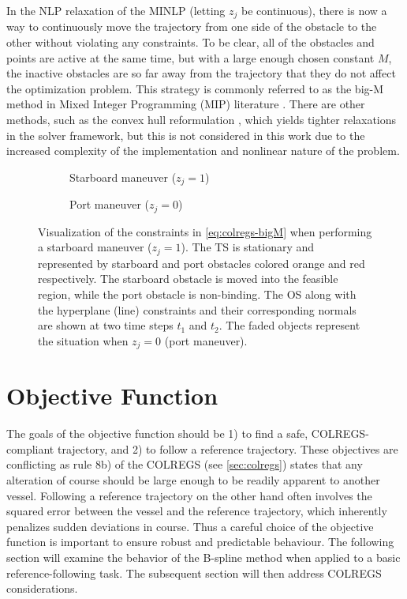 In the NLP relaxation of the MINLP (letting $z_j$ be continuous), there is now a way to continuously move the trajectory from one side of the obstacle to the other without violating any constraints. To be clear, all of the obstacles and points are active at the same time, but with a large enough chosen constant $M$, the inactive obstacles are so far away from the trajectory that they do not affect the optimization problem. This strategy is commonly referred to as the big-M method in Mixed Integer Programming (MIP) literature \citep{gan2012adaptive}. There are other methods, such as the convex hull reformulation \citep{sherali1994hierarchy}, which yields tighter relaxations in the solver framework, but this is not considered in this work due to the increased complexity of the implementation and nonlinear nature of the problem.

\begin{figure}
    \centering
    \begin{subfigure}[t]{\textwidth}
        \centering
        
        \caption{Starboard maneuver ($z_j=1$)}
        \label{fig:non-convex-obstacle-mi-sb}
    \end{subfigure}
    \begin{subfigure}[t]{\textwidth}
        \centering
        
        \caption{Port maneuver ($z_j=0$)}
        \label{fig:non-convex-obstacle-mi-port}
    \end{subfigure}
    \caption{Visualization of the constraints in \cref{eq:colregs-bigM} when performing a starboard maneuver ($z_j=1$). The TS is stationary and represented by starboard and port obstacles colored orange and red respectively. 
    The starboard obstacle is moved into the feasible region, while the port obstacle is non-binding. The OS along with the hyperplane (line) constraints and their corresponding normals are shown at two time steps $t_1$ and $t_2$. The faded objects represent the situation when $z_j=0$ (port maneuver). 
    }
    \label{fig:non-convex-obstacle-mi}
\end{figure}



\section{Objective Function}
The goals of the objective function should be 1) to find a safe, COLREGS-compliant trajectory, and 2) to follow a reference trajectory. These objectives are conflicting as rule 8b) of the COLREGS (see \cref{sec:colregs}) states that any alteration of course should be large enough to be readily apparent to another vessel. Following a reference trajectory on the other hand often involves the squared error between the vessel and the reference trajectory, which inherently penalizes sudden deviations in course. 
Thus a careful choice of the objective function is important to ensure robust and predictable behaviour. 
The following section will examine the behavior of the B-spline method when applied to a basic reference-following task. The subsequent section will then address COLREGS considerations.


